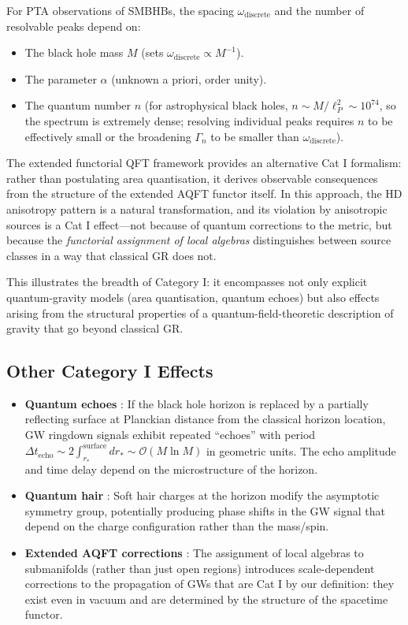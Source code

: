 \documentclass[11pt]{article}
\begin{document}
For PTA observations of SMBHBs, the spacing $\omega_{\mathrm{discrete}}$ and the number of resolvable peaks depend on:
\begin{itemize}
\item The black hole mass $M$ (sets $\omega_{\mathrm{discrete}} \propto M^{-1}$).
\item The parameter $\alpha$ (unknown a priori, order unity).
\item The quantum number $n$ (for astrophysical black holes, $n \sim M/\ell_P^2 \sim 10^{74}$, so the spectrum is extremely dense; resolving individual peaks requires $n$ to be effectively small or the broadening $\Gamma_n$ to be smaller than $\omega_{\mathrm{discrete}}$).
\end{itemize}

The extended functorial QFT framework \cite{GW-BacQFT} provides an alternative Cat I formalism: rather than postulating area quantisation, it derives observable consequences from the structure of the extended AQFT functor itself. In this approach, the HD anisotropy pattern is a natural transformation, and its violation by anisotropic sources is a Cat I effect---not because of quantum corrections to the metric, but because the \emph{functorial assignment of local algebras} distinguishes between source classes in a way that classical GR does not.

This illustrates the breadth of Category I: it encompasses not only explicit quantum-gravity models (area quantisation, quantum echoes) but also effects arising from the structural properties of a quantum-field-theoretic description of gravity that go beyond classical GR.

\subsection{Other Category I Effects}

\begin{itemize}
\item \textbf{Quantum echoes} \cite{Cardoso:2016vtg}: If the black hole horizon is replaced by a partially reflecting surface at Planckian distance from the classical horizon location, GW ringdown signals exhibit repeated ``echoes'' with period $\Delta t_{\mathrm{echo}} \sim 2 \int_{r_*}^{\mathrm{surface}} dr_* \sim \mathcal{O}(M \ln M)$ in geometric units. The echo amplitude and time delay depend on the microstructure of the horizon.

\item \textbf{Quantum hair} \cite{Haggard:2014}: Soft hair charges at the horizon modify the asymptotic symmetry group, potentially producing phase shifts in the GW signal that depend on the charge configuration rather than the mass/spin.

\item \textbf{Extended AQFT corrections} \cite{Brunetti:2003, GW-BacQFT}: The assignment of local algebras to submanifolds (rather than just open regions) introduces scale-dependent corrections to the propagation of GWs that are Cat I by our definition: they exist even in vacuum and are determined by the structure of the spacetime functor.
\end{itemize}
\end{document}
